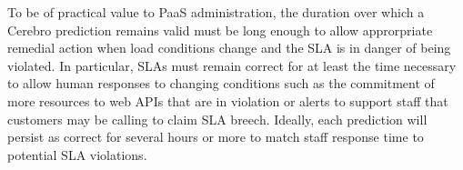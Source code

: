 %




To be of practical value to PaaS administration, the duration over which a
Cerebro prediction remains valid must be long enough to allow approrpriate
remedial action when load conditions change and the SLA is in danger of being
violated.  In particular, SLAs must remain correct for at least the time
necessary to allow human responses to changing conditions such as
the commitment of more resources to web APIs that are in violation or alerts
to support staff that customers may be calling to claim SLA breech.  Ideally,
each prediction will persist as correct for several hours or more to match
staff response time to potential SLA violations.

